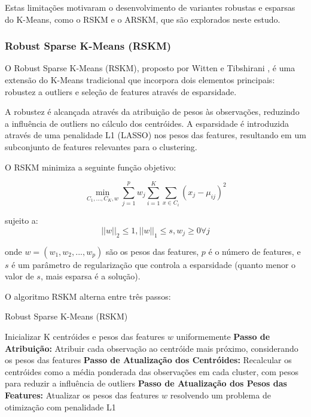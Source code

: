 \documentclass[conference]{IEEEtran}
\begin{document}
Estas limitações motivaram o desenvolvimento de variantes robustas e esparsas do K-Means, como o RSKM e o ARSKM, que são explorados neste estudo.

\subsubsection{Robust Sparse K-Means (RSKM)}
O Robust Sparse K-Means (RSKM), proposto por Witten e Tibshirani \cite{witten2010framework}, é uma extensão do K-Means tradicional que incorpora dois elementos principais: robustez a outliers e seleção de features através de esparsidade.

A robustez é alcançada através da atribuição de pesos às observações, reduzindo a influência de outliers no cálculo dos centróides. A esparsidade é introduzida através de uma penalidade L1 (LASSO) nos pesos das features, resultando em um subconjunto de features relevantes para o clustering.

O RSKM minimiza a seguinte função objetivo:

\begin{equation}
\min_{C_1,...,C_K, w} \sum_{j=1}^{p} w_j \sum_{i=1}^{K} \sum_{x \in C_i} (x_j - \mu_{ij})^2
\end{equation}

sujeito a:
\begin{equation}
||w||_2 \leq 1, ||w||_1 \leq s, w_j \geq 0 \forall j
\end{equation}

onde $w = (w_1, w_2, ..., w_p)$ são os pesos das features, $p$ é o número de features, e $s$ é um parâmetro de regularização que controla a esparsidade (quanto menor o valor de $s$, mais esparsa é a solução).

O algoritmo RSKM alterna entre três passos:

\begin{algorithm}
\caption{Robust Sparse K-Means (RSKM)}
\begin{algorithmic}[1]
\STATE Inicializar K centróides e pesos das features $w$ uniformemente
\REPEAT
\STATE \textbf{Passo de Atribuição:} Atribuir cada observação ao centróide mais próximo, considerando os pesos das features
\STATE \textbf{Passo de Atualização dos Centróides:} Recalcular os centróides como a média ponderada das observações em cada cluster, com pesos para reduzir a influência de outliers
\STATE \textbf{Passo de Atualização dos Pesos das Features:} Atualizar os pesos das features $w$ resolvendo um problema de otimização com penalidade L1
\end{algorithmic}
\end{algorithm}
\end{document}
